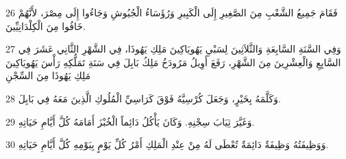 \par 26 فَقَامَ جَمِيعُ الشَّعْبِ مِنَ الصَّغِيرِ إِلَى الْكَبِيرِ وَرُؤَسَاءُ الْجُيُوشِ وَجَاءُوا إِلَى مِصْرَ، لأَنَّهُمْ خَافُوا مِنَ الْكِلْدَانِيِّينَ.
\par 27 وَفِي السَّنَةِ السَّابِعَةِ وَالثَّلاَثِينَ لِسَبْيِ يَهُويَاكِينَ مَلِكِ يَهُوذَا، فِي الشَّهْرِ الثَّانِي عَشَرَ فِي السَّابِعِ وَالْعِشْرِينَ مِنَ الشَّهْرِ، رَفَعَ أَوِيلُ مَرُودَخُ مَلِكُ بَابِلَ فِي سَنَةِ تَمَلُّكِهِ رَأْسَ يَهُويَاكِينَ مَلِكِ يَهُوذَا مِنَ السِّجْنِ
\par 28 وَكَلَّمَهُ بِخَيْرٍ، وَجَعَلَ كُرْسِيَّهُ فَوْقَ كَرَاسِيِّ الْمُلُوكِ الَّذِينَ مَعَهُ فِي بَابِلَ.
\par 29 وَغَيَّرَ ثِيَابَ سِجْنِهِ. وَكَانَ يَأْكُلُ دَائِماً الْخُبْزَ أَمَامَهُ كُلَّ أَيَّامِ حَيَاتِهِ.
\par 30 وَوَظِيفَتُهُ وَظِيفَةٌ دَائِمَةٌ تُعْطَى لَهُ مِنْ عِنْدِ الْمَلِكِ أَمْرُ كُلِّ يَوْمٍ بِيَوْمِهِ كُلَّ أَيَّامِ حَيَاتِهِ.

